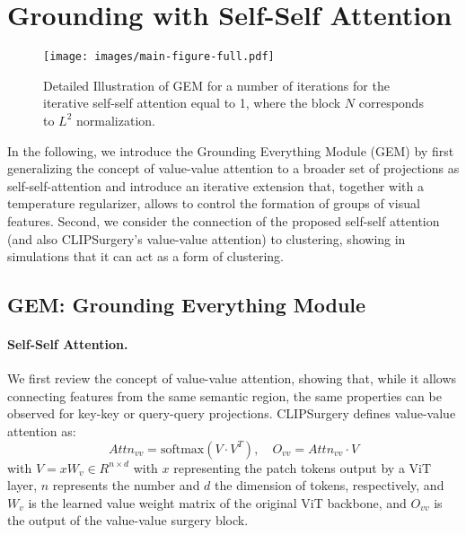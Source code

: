 \documentclass[10pt,twocolumn,letterpaper]{article}
\begin{document}
\section{Grounding with Self-Self Attention}\label{subsec:GEM}
\begin{figure}[t]
\centering
      \texttt{[image: images/main-figure-full.pdf]}
\caption{Detailed Illustration of GEM for a number of iterations for the iterative self-self attention equal to 1, where the block $N$ corresponds to $L^2$ normalization.}\label{fig:detailed-GEM}
\end{figure}
In the following, we introduce the Grounding Everything Module (GEM) by first generalizing the concept of value-value attention \citep{li2023clipsurgery} to a broader set of projections as self-self-attention and introduce an iterative extension that, together with a temperature regularizer, allows to control the formation of groups of visual features.
Second, we consider the connection of the proposed self-self attention (and also CLIPSurgery's value-value attention) to clustering, showing in simulations that it can act as a form of clustering. 
\subsection{GEM: Grounding Everything Module}\label{subsec:self-self-attn}
\paragraph{Self-Self Attention.}
We first review the concept of value-value attention, showing that, while it allows connecting features from the same semantic region, the same properties can be observed for key-key or query-query projections. CLIPSurgery defines value-value attention as:
\begin{equation}
Attn_{vv} = \mathrm{softmax}(V \cdot V^T), \quad O_{vv} = Attn_{vv} \cdot V
\end{equation}
with 
$V = x W_v \in R^{n\times d}$ with $x$ representing the patch tokens output by a ViT layer, $n$ represents the number and $d$ the dimension of tokens, respectively, and $W_v$ is the learned value weight matrix of the original ViT backbone, and $O_{vv}$ is the output of the value-value surgery block. 
\end{document}
